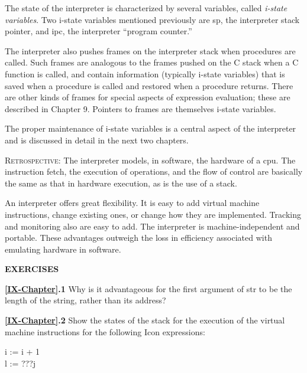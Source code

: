 The state of the interpreter is characterized by several variables,
called \textit{i-state variables}. Two i-state variables mentioned
previously are sp, the interpreter stack pointer, and ipc, the
interpreter ``program counter.''

The interpreter also pushes frames on the interpreter stack when
procedures are called. Such frames are analogous to the frames pushed
on the C stack when a C function is called, and contain information
(typically i-state variables) that is saved when a procedure is called
and restored when a procedure returns. There are other kinds of frames
for special aspects of expression evaluation; these are described in
Chapter 9. Pointers to frames are themselves i-state variables.

The proper maintenance of i-state variables is a central aspect of the
interpreter and is discussed in detail in the next two chapters.

\bigskip\bigskip
\textsc{Retrospective}: The interpreter models, in software, the hardware of a
cpu. The instruction fetch, the execution of operations, and the flow
of control are basically the same as that in hardware execution, as is
the use of a stack.

An interpreter offers great flexibility. It is easy to add virtual
machine instructions, change existing ones, or change how they are
implemented. Tracking and monitoring also are easy to add. The
interpreter is machine-independent and portable. These advantages
outweigh the loss in efficiency associated with emulating hardware in
software.

\bigskip

\noindent\textbf{EXERCISES}

\noindent\textbf{\ref*{IX-Chapter}.1}
Why is it advantageous for the first argument of str to be the
length of the string, rather than its address?

\noindent\textbf{\ref*{IX-Chapter}.2}
Show the states of the stack for the execution of the virtual
machine instructions for the following Icon expressions:

\begin{iconcode}
\>   i := i + 1 \\
\>   l := ???j
\end{iconcode}

